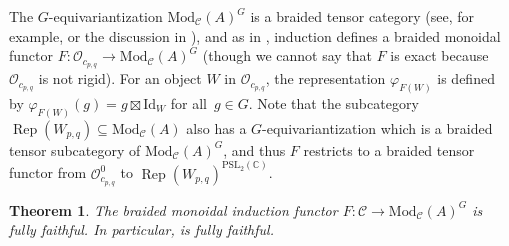 \documentclass[pdftex]{sigma}
\numberwithin{equation}{section}
\newtheorem{Theorem}{Theorem}[section]
\theoremstyle{definition}
\begin{document}
The $G$-equivariantization $\mathrm{Mod}_\mathcal{C}(A)^G$ is a braided tensor category (see, for example, \cite{EGNO} or the discussion in \cite[Section 7]{MY-cp1-Vir}),
and as in \cite[Lemma 7.13]{MY-cp1-Vir},
induction defines a braided monoidal functor $F\colon\mathcal{O}_{c_{p,q}}\rightarrow\mathrm{Mod}_\mathcal{C}(A)^G$ (though we cannot say that $F$ is exact because $\mathcal{O}_{c_{p,q}}$ is not rigid). For an object $W$ in $\mathcal{O}_{c_{p,q}}$, the representation $\varphi_{F(W)}$ is defined by $\varphi_{F(W)}(g)=g\boxtimes\mathrm{Id}_W$ for all~${g\in G}$. Note that the subcategory $\operatorname{Rep}(W_{p,q})\subseteq\mathrm{Mod}_\mathcal{C}(A)$ also has a $G$-equivariantization which is a braided tensor subcategory of $\mathrm{Mod}_\mathcal{C}(A)^G$, and thus $F$ restricts to a braided tensor functor from $\mathcal{O}_{c_{p,q}}^0$ to $\operatorname{Rep}(W_{p,q})^{\mathrm{PSL}_2(\mathbb{C})}$.
\begin{Theorem}
The braided monoidal induction functor $F\colon\mathcal{C}\rightarrow\mathrm{Mod}_\mathcal{C}(A)^G$ is fully faithful. In particular,  is fully faithful.
\end{Theorem}
\end{document}
